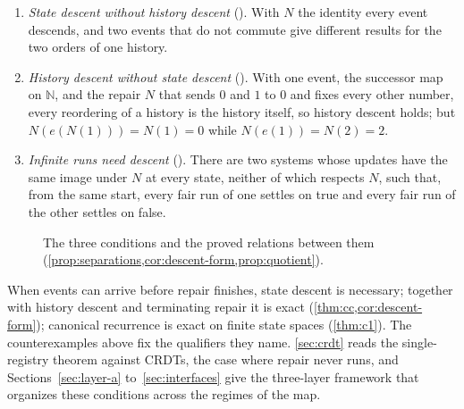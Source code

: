 \begin{proposition}\label{prop:separations}
\leavevmode
\begin{enumerate}[label=(\alph*)]
  \item \emph{State descent without history descent} (). With $N$ the
    identity every event descends, and two events that do not commute give different results for the
    two orders of one history.
  \item \emph{History descent without state descent} (). With one event,
    the successor map on $\mathbb{N}$, and the repair $N$ that sends $0$ and $1$ to $0$ and fixes every
    other number, every reordering of a history is the history itself, so history descent holds; but
    $N(e(N(1))) = N(1) = 0$ while $N(e(1)) = N(2) = 2$.
  \item \emph{Infinite runs need descent} (). There are two systems whose
    updates have the same image under $N$ at every state, neither of which respects $N$, such that,
    from the same start, every fair run of one settles on \textsf{true} and every fair run of the
    other settles on \textsf{false}.
\end{enumerate}
\end{proposition}

\begin{figure}[t]
\centering
{}
\caption{The three conditions and the proved relations between them
(\cref{prop:separations,cor:descent-form,prop:quotient}).}
\label{fig:hierarchy}
\end{figure}

When events can arrive before repair finishes, state descent is necessary; together with history
descent and terminating repair it is exact (\cref{thm:cc,cor:descent-form}); canonical recurrence is exact on finite state spaces (\cref{thm:c1}).
The counterexamples above fix the qualifiers they name. \cref{sec:crdt} reads the single-registry theorem against CRDTs, the case
where repair never runs, and Sections~\ref{sec:layer-a} to~\ref{sec:interfaces} give the
three-layer framework that organizes these conditions across the regimes of the map.
